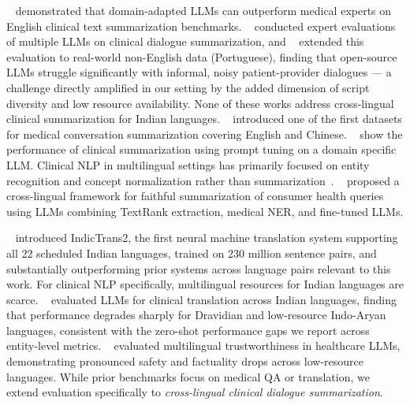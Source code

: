 \documentclass[conference]{IEEEtran}
\begin{document}
\citeauthor{vanveen2023adapted}~\cite{vanveen2023adapted} demonstrated that
domain-adapted LLMs can outperform medical experts on English clinical text
summarization benchmarks. \citeauthor{FraileNavarro2025}~\cite{FraileNavarro2025}
conducted expert evaluations of multiple LLMs on clinical dialogue
summarization, and \citeauthor{Ferreira2025}~\cite{Ferreira2025} extended
this evaluation to real-world non-English data (Portuguese), finding that
open-source LLMs struggle significantly with informal, noisy patient-provider
dialogues --- a challenge directly amplified in our setting by the added
dimension of script diversity and low resource availability. None of these
works address cross-lingual clinical summarization for Indian languages.
\citeauthor{zeng2020meddialog}~\cite{zeng2020meddialog} introduced one of
the first datasets for medical conversation summarization covering English
and Chinese. \citeauthor{lyu2025automatic}~\cite{lyu2025automatic} show
the performance of clinical summarization using prompt tuning on a domain
specific LLM. Clinical NLP in multilingual settings has primarily focused
on entity recognition and concept normalization rather than
summarization~\cite{gaschi2023multilingual}.
\citeauthor{abrar2025faithful}~\cite{abrar2025faithful} proposed a
cross-lingual framework for faithful summarization of consumer health
queries using LLMs combining TextRank extraction, medical NER, and
fine-tuned LLMs.

\citeauthor{gala2023indictrans2}~\cite{gala2023indictrans2} introduced
IndicTrans2, the first neural machine translation system supporting all 22
scheduled Indian languages, trained on 230 million sentence pairs, and
substantially outperforming prior systems across language pairs relevant to
this work. For clinical NLP specifically, multilingual resources for Indian
languages are scarce. \citeauthor{singh2025indihealthbench}~\cite{singh2025indihealthbench}
evaluated LLMs for clinical translation across Indian languages, finding
that performance degrades sharply for Dravidian and low-resource Indo-Aryan
languages, consistent with the zero-shot performance gaps we report across
entity-level metrics. \citeauthor{ghosh2025clinic}~\cite{ghosh2025clinic}
evaluated multilingual trustworthiness in healthcare LLMs, demonstrating
pronounced safety and factuality drops across low-resource languages. While
prior benchmarks focus on medical QA or translation, we extend evaluation
specifically to \emph{cross-lingual clinical dialogue summarization}.

\end{document}
